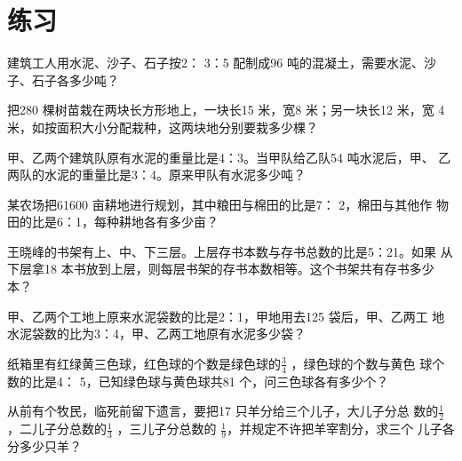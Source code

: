 \section{练习}
\vspace{-0.4cm}
\begin{exercise}
    建筑工人用水泥、沙子、石子按2： 3：5 配制成96 吨的混凝土，需要水泥、沙
    子、石子各多少吨？  
\end{exercise}
\vspace{3.2cm}
\begin{exercise}
    把280 棵树苗栽在两块长方形地上，一块长15 米，宽8 米；另一块长12 米，宽
4 米，如按面积大小分配栽种，这两块地分别要栽多少棵？
\end{exercise}
\vspace{3.2cm}
\begin{exercise}
    甲、乙两个建筑队原有水泥的重量比是4：3。当甲队给乙队54 吨水泥后，甲、
    乙两队的水泥的重量比是3：4。原来甲队有水泥多少吨？
\end{exercise}
\vspace{3.2cm}
\begin{exercise}
    某农场把61600 亩耕地进行规划，其中粮田与棉田的比是7： 2，棉田与其他作
物田的比是6：1，每种耕地各有多少亩？
\end{exercise}
\vspace{3.2cm}
\begin{exercise}
    王晓峰的书架有上、中、下三层。上层存书本数与存书总数的比是5：21。如果
从下层拿18 本书放到上层，则每层书架的存书本数相等。这个书架共有存书多少
本？
\end{exercise}
\vspace{3.2cm}
\begin{exercise}
    甲、乙两个工地上原来水泥袋数的比是2：1，甲地用去125 袋后，甲、乙两工
地水泥袋数的比为3：4，甲、乙两工地原有水泥多少袋？
\end{exercise}
\vspace{3.2cm}
\begin{exercise}
    纸箱里有红绿黄三色球，红色球的个数是绿色球的$\frac{3}{4}$ ，绿色球的个数与黄色
球个数的比是4： 5，已知绿色球与黄色球共81 个，问三色球各有多少个？
\end{exercise}
\vspace{3.2cm}
\begin{exercise}
    从前有个牧民，临死前留下遗言，要把17 只羊分给三个儿子，大儿子分总
数的$\frac{1}{2}$ ，二儿子分总数的$\frac{1}{3}$ ，三儿子分总数的
$\frac{1}{9}$，并规定不许把羊宰割分，求三个
儿子各分多少只羊？
\end{exercise}
\vspace{3.2cm}
